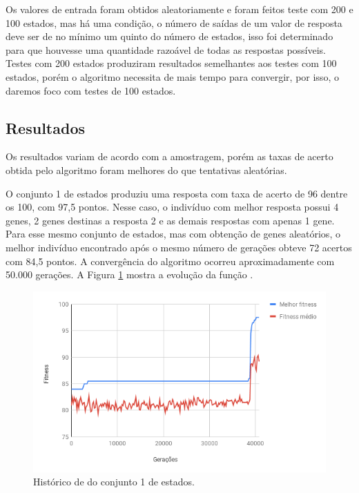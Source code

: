 Os valores de entrada foram obtidos aleatoriamente e foram feitos teste com 200 e 100 estados, mas há uma condição, o número de saídas de um valor de resposta deve ser de no mínimo um quinto do número de estados, isso foi determinado para que houvesse uma quantidade razoável de todas as respostas possíveis. Testes com 200 estados produziram resultados semelhantes aos testes com 100 estados, porém o algoritmo necessita de mais tempo para convergir, por isso, o daremos foco com testes de 100 estados.

\subsection{Resultados}

Os resultados variam de acordo com a amostragem, porém as taxas de acerto obtida pelo algoritmo foram melhores do que tentativas aleatórias.

O conjunto 1 de estados produziu uma resposta com taxa de acerto de 96 dentre os 100, com 97,5 pontos. Nesse caso, o indivíduo com melhor resposta possui 4 genes, 2 genes destinas a resposta 2 e as demais respostas com apenas 1 gene. Para esse mesmo conjunto de estados, mas com obtenção de genes aleatórios, o melhor indivíduo encontrado após o mesmo número de gerações obteve 72 acertos com 84,5 pontos. A convergência do algoritmo ocorreu aproximadamente com 50.000 gerações. A Figura \ref{figura:resultado_97} mostra a evolução da função \fitness.

\begin{figure}[htb]
    \caption{Histórico de \fitness do conjunto 1 de estados.}
    \label{figura:resultado_97}
    \centering
    \includegraphics[scale=0.8]{images/resultado_97}
    \fautor
\end{figure}

